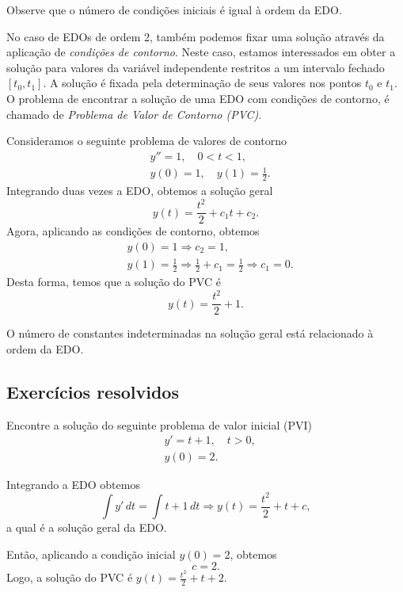 \begin{obs}
  Observe que o número de condições iniciais é igual à ordem da EDO.
\end{obs}

No caso de EDOs de ordem 2, também podemos fixar uma solução através da aplicação de \emph{condições de contorno}. Neste caso, estamos interessados em obter a solução para valores da variável independente restritos a um intervalo fechado $[t_0, t_1]$. A solução é fixada pela determinação de seus valores nos pontos $t_0$ e $t_1$. O problema de encontrar a solução de uma EDO com condições de contorno, é chamado de \emph{Problema de Valor de Contorno (PVC)}.

\begin{ex}
  Consideramos o seguinte problema de valores de contorno
  \begin{align}
    &y'' = 1,\quad 0 < t < 1,\\
    &y(0) = 1,\quad y(1) = \frac{1}{2}.
  \end{align}
  Integrando duas vezes a EDO, obtemos a solução geral
  \begin{equation}
    y(t) = \frac{t^2}{2} + c_1t + c_2.
  \end{equation}
  Agora, aplicando as condições de contorno, obtemos
  \begin{align}
    &y(0) = 1 \Rightarrow c_2 = 1,\\
    &y(1) = \frac{1}{2} \Rightarrow \frac{1}{2} + c_1 = \frac{1}{2} \Rightarrow c_1 = 0.
  \end{align}
  Desta forma, temos que a solução do PVC é
  \begin{equation}
    y(t) = \frac{t^2}{2} + 1.
  \end{equation}
\end{ex}

\begin{obs}
  O número de constantes indeterminadas na solução geral está relacionado à ordem da EDO.
\end{obs}

\subsection*{Exercícios resolvidos}

\begin{exeresol}
  Encontre a solução do seguinte problema de valor inicial (PVI)
  \begin{align}
    &y' = t + 1,\quad t>0,\\
    &y(0) = 2.
  \end{align}
\end{exeresol}
\begin{resol}
  Integrando a EDO obtemos
  \begin{equation}
    \int y'\,dt = \int t+1\,dt \Rightarrow y(t) = \frac{t^2}{2} + t + c,
  \end{equation}
  a qual é a solução geral da EDO.

  Então, aplicando a condição inicial $y(0) = 2$, obtemos
  \begin{equation}
    c = 2.
  \end{equation}
  Logo, a solução do PVC é $y(t) = \frac{t^2}{2} + t + 2$.
\end{resol}

